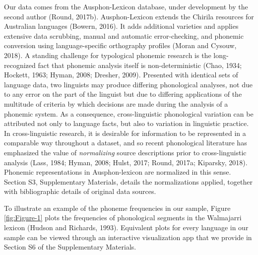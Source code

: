Our data comes from the Ausphon-Lexicon database, under development by the second author (Round, 2017b). Ausphon-Lexicon extends the Chirila resources for Australian languages (Bowern, 2016). It adds additional varieties and applies extensive data scrubbing, manual and automatic error-checking, and phonemic conversion using language-specific orthography profiles (Moran and Cysouw, 2018). A standing challenge for typological phonemic research is the long-recognized fact that phonemic analysis itself is non-deterministic (Chao, 1934; Hockett, 1963; Hyman, 2008; Dresher, 2009). Presented with identical sets of language data, two linguists may produce differing phonological analyses, not due to any error on the part of the linguist but due to differing applications of the multitude of criteria by which decisions are made during the analysis of a phonemic system. As a consequence, cross-linguistic phonological variation can be attributed not only to language facts, but also to variation in linguistic practice. In cross-linguistic research, it is desirable for information to be represented in a comparable way throughout a dataset, and so recent phonological literature has emphasized the value of \emph{normalizing} source descriptions prior to cross-linguistic analysis (Lass, 1984; Hyman, 2008; Hulst, 2017; Round, 2017a; Kiparsky, 2018). Phonemic representations in Ausphon-lexicon are normalized in this sense. Section S3, Supplementary Materials, details the normalizations applied, together with bibliographic details of original data sources.

To illustrate an example of the phoneme frequencies in our sample, Figure \ref{fig:Figure-1} plots the frequencies of phonological segments in the Walmajarri lexicon (Hudson and Richards, 1993). Equivalent plots for every language in our sample can be viewed through an interactive visualization app that we provide in Section S6 of the Supplementary Materials.

